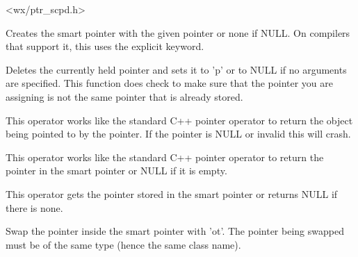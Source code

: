 
<wx/ptr\_scpd.h>


\rtfsp




Creates the smart pointer with the given pointer or none if NULL.  On
compilers that support it, this uses the explicit keyword.



Deletes the currently held pointer and sets it to 'p' or to NULL if no 
arguments are specified. This function does check to make sure that the
pointer you are assigning is not the same pointer that is already stored.



This operator works like the standard C++ pointer operator to return the object
being pointed to by the pointer.  If the pointer is NULL or invalid this will
crash.



This operator works like the standard C++ pointer operator to return the pointer
in the smart pointer or NULL if it is empty.



This operator gets the pointer stored in the smart pointer or returns NULL if
there is none.



Swap the pointer inside the smart pointer with 'ot'. The pointer being swapped
must be of the same type (hence the same class name).

